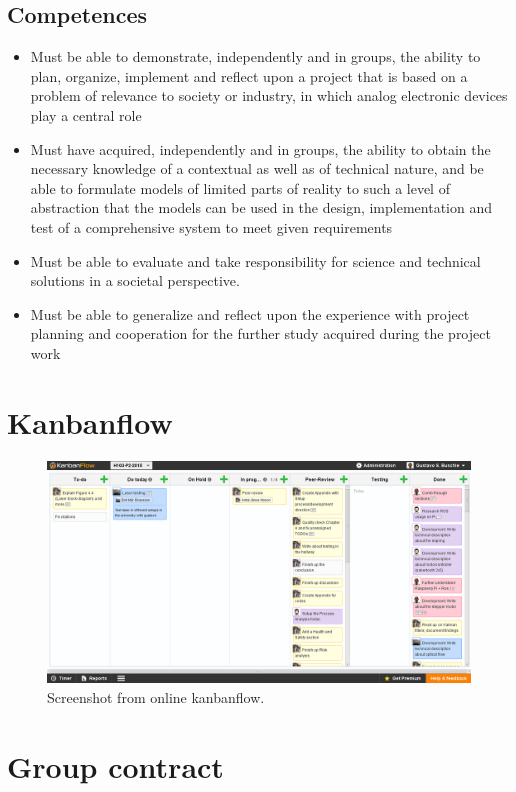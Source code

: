 \subsection{Competences}
\begin{itemize}
	\item Must be able to demonstrate, independently and in groups, the ability to plan, organize, implement and reflect upon a project that is based on a problem of relevance to society or industry, in which analog electronic devices play a central role
	\item Must have acquired, independently and in groups, the ability to obtain the necessary knowledge of a contextual as well as of technical nature, and be able to formulate models of limited parts of reality to such a level of abstraction that the models can be used in the design, implementation and test of a comprehensive system to meet given requirements
	\item Must be able to evaluate and take responsibility for science and technical solutions in a societal perspective.
	\item Must be able to generalize and reflect upon the experience with project planning and cooperation for the further study acquired during the project work
\end{itemize}

\section{Kanbanflow}

\begin{figure}[H]
	\centering
	\includegraphics[width=1\linewidth]{images/kanban.png}
	\caption{Screenshot from online kanbanflow.}
	\label{fig:kanban}
\end{figure}

\clearpage
\section{Group contract}


